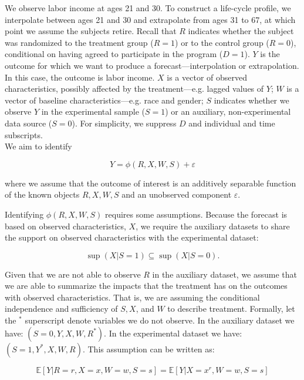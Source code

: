 We observe labor income at ages 21 and 30. To construct a life-cycle profile, we interpolate between ages 21 and 30 and extrapolate from ages 31 to 67, at which point we assume the subjects retire. Recall that $R$ indicates whether the subject was randomized to the treatment group ($R=1$) or to the control group ($R=0$), conditional on having agreed to participate in the program ($D = 1$). $Y$ is the outcome for which we want to produce a forecast---interpolation or extrapolation. In this case, the outcome is labor income. $X$ is a vector of observed characteristics, possibly affected by the treatment---e.g. lagged values of $Y$; $W$ is a vector of baseline characteristics---e.g. race and gender; $S$ indicates whether we observe $Y$ in the experimental sample ($S=1$) or an auxiliary, non-experimental data source ($S=0$). For simplicity, we suppress $D$ and individual and time subscripts. \\

We aim to identify

\begin{equation}
Y = \phi \left( R, X, W, S \right) + \varepsilon \label{eq:forecast-param}
\end{equation}

\noindent where we assume that the outcome of interest is an additively separable function of the known objects $R, X, W, S$ and an unobserved component $\varepsilon$.

Identifying $\phi \left( R, X, W, S \right)$ requires some assumptions. Because the forecast is based on observed characteristics, $X$, we require the auxiliary datasets to share the support on observed characteristics with the experimental dataset:

\begin{equation}
\sup \left( X | S = 1 \right) \subseteq \sup \left( X | S = 0 \right).
\end{equation}

Given that we are not able to observe $R$ in the auxiliary dataset, we assume that we are able to summarize the impacts that the treatment has on the outcomes with observed characteristics. That is, we are assuming the conditional independence and sufficiency of $S, X$, and $W$ to describe treatment. Formally, let the $^{*}$ superscript denote variables we do not observe. In the auxiliary dataset we have: $\left( S = 0, Y, X, W, R^* \right)$. In the experimental dataset we have: $\left( S = 1, Y^*, X, W, R \right)$. This assumption can be written as:

\begin{equation}
\mathbb{E} \left[ Y | R = r, X = x, W = w, S = s\right] =  \mathbb{E} \left[ Y | X = x^r, W = w, S = s\right]
\end{equation}

